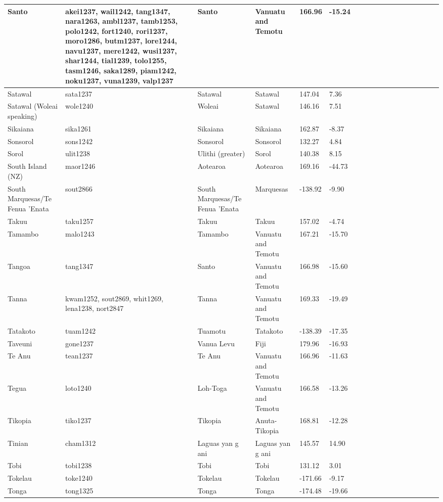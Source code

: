\documentclass[draft,10pt]{article} %
\begin{document}
\begin{landscape}
\begin{longtable}{| p{2.5cm} |  p{7cm} | p{2.5cm}  | p{2.5cm}  | p{2.5cm}  | p{2.5cm}  | p{2.5cm}  | p{2cm}  | p{1cm} | p{1cm}  | p{1cm} | p{1cm}  | p{1.5cm}  | p{1cm} | p{1cm}  | p{1cm}  |p{1cm}  | p{1cm}    |}
 Santo & akei1237, wail1242, tang1347, nara1263, ambl1237, tamb1253, polo1242, fort1240, rori1237, moro1286, butm1237, lore1244, navu1237, mere1242, wusi1237, shar1244, tial1239, tolo1255, tasm1246, saka1289, piam1242, noku1237, vuna1239, valp1237 & Santo & Vanuatu and Temotu & 166.96 & -15.24 \\ \hline
 Satawal & sata1237 & Satawal & Satawal & 147.04 & 7.36 \\ \hline
 Satawal (Woleai speaking) & wole1240 & Woleai & Satawal & 146.16 & 7.51 \\ \hline
 Sikaiana & sika1261 & Sikaiana & Sikaiana & 162.87 & -8.37 \\ \hline
 Sonsorol & sons1242 & Sonsorol & Sonsorol & 132.27 & 4.84 \\ \hline
 Sorol & ulit1238 & Ulithi (greater) & Sorol & 140.38 & 8.15 \\ \hline
 South Island (NZ) & maor1246 & Aotearoa & Aotearoa & 169.16 & -44.73 \\ \hline
 South Marquesas/Te Fenua 'Enata & sout2866 & South Marquesas/Te Fenua 'Enata  & Marquesas & -138.92 & -9.90 \\ \hline
 Takuu & taku1257 & Takuu & Takuu & 157.02 & -4.74 \\ \hline
 Tamambo & malo1243 & Tamambo & Vanuatu and Temotu & 167.21 & -15.70 \\ \hline
 Tangoa & tang1347 & Santo & Vanuatu and Temotu & 166.98 & -15.60 \\ \hline
 Tanna & kwam1252, sout2869, whit1269, lena1238, nort2847 & Tanna & Vanuatu and Temotu & 169.33 & -19.49 \\ \hline
 Tatakoto & tuam1242 & Tuamotu & Tatakoto & -138.39 & -17.35 \\ \hline
 Taveuni & gone1237 & Vanua Levu & Fiji & 179.96 & -16.93 \\ \hline
 Te Anu & tean1237 & Te Anu & Vanuatu and Temotu & 166.96 & -11.63 \\ \hline
 Tegua & loto1240 & Loh-Toga & Vanuatu and Temotu & 166.58 & -13.26 \\ \hline
 Tikopia & tiko1237 & Tikopia & Anuta-Tikopia & 168.81 & -12.28 \\ \hline
 Tinian & cham1312 & Laguas yan g ani & Laguas yan g ani & 145.57 & 14.90 \\ \hline
 Tobi & tobi1238 & Tobi & Tobi & 131.12 & 3.01 \\ \hline
 Tokelau & toke1240 & Tokelau & Tokelau & -171.66 & -9.17 \\ \hline
 Tonga & tong1325 & Tonga & Tonga & -174.48 & -19.66 \\ \hline

\end{longtable}
\end{landscape}
\end{document}
